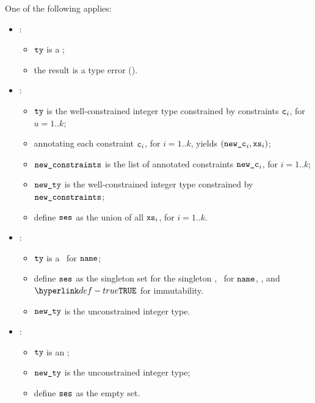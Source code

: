 \ProseParagraph
One of the following applies:
\begin{itemize}
  \item {}:
    \begin{itemize}
      \item $\texttt{ty}$ is a \pendingconstrainedintegertype;
      \item the result is a type error (\UnexpectedType).
    \end{itemize}
  \item {}:
    \begin{itemize}
      \item $\texttt{ty}$ is the well-constrained integer type constrained by
        constraints $\texttt{c}_i$, for $u=1..k$;
      \item annotating each constraint $\texttt{c}_i$, for $i=1..k$,
      yields $(\texttt{new\_c}_i, \texttt{xs}_i)$\ProseOrTypeError;
      \item $\texttt{new\_constraints}$ is the list of annotated constraints $\texttt{new\_c}_i$,
      for $i=1..k$;
      \item $\texttt{new\_ty}$ is the well-constrained integer type constrained
        by $\texttt{new\_constraints}$;
      \item define $\texttt{ses}$ as the union of all $\texttt{xs}_i$, for $i=1..k$.
    \end{itemize}

    \item {}:
    \begin{itemize}
      \item $\texttt{ty}$ is a \parameterizedintegertype\ for $\texttt{name}$;
      \item define $\texttt{ses}$ as the singleton set for the singleton \sideeffectdescriptorterm,
            \ReadLocalTerm\ for $\texttt{name}$, \timeframeconstant, and $\True$ for immutability.
      \item $\texttt{new\_ty}$ is the unconstrained integer type.
    \end{itemize}

    \item {}:
    \begin{itemize}
      \item $\texttt{ty}$ is an \unconstrainedintegertype;
      \item $\texttt{new\_ty}$ is the unconstrained integer type;
      \item define $\texttt{ses}$ as the empty set.
    \end{itemize}
  \end{itemize}

